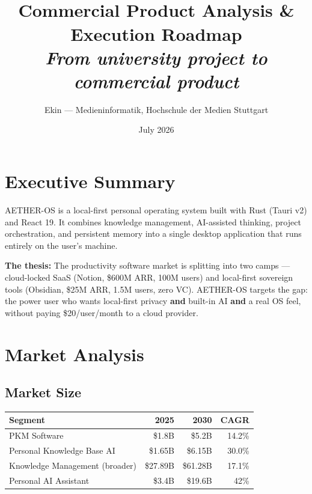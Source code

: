 \documentclass[11pt,a4paper]{article}
\title{\vspace{2cm}{\Huge\textbf{AETHER-OS}}\\[0.5cm]{\Large Commercial Product Analysis \& Execution Roadmap}\\[0.3cm]{\large\textit{From university project to commercial product}}\\[1cm]}
\author{Ekin --- Medieninformatik, Hochschule der Medien Stuttgart}
\date{July 2026}
\begin{document}
\maketitle
\thispagestyle{empty}
\newpage
\tableofcontents
\newpage

\section{Executive Summary}

AETHER-OS is a local-first personal operating system built with Rust (Tauri v2) and React 19. It combines knowledge management, AI-assisted thinking, project orchestration, and persistent memory into a single desktop application that runs entirely on the user's machine.

\textbf{The thesis:} The productivity software market is splitting into two camps --- cloud-locked SaaS (Notion, \$600M ARR, 100M users) and local-first sovereign tools (Obsidian, \$25M ARR, 1.5M users, zero VC). AETHER-OS targets the gap: the power user who wants local-first privacy \textbf{and} built-in AI \textbf{and} a real OS feel, without paying \$20/user/month to a cloud provider.

\section{Market Analysis}

\subsection{Market Size}

\begin{table}[h]\centering\small
\begin{tabularx}{\textwidth}{Xrrr}
\toprule
\textbf{Segment} & \textbf{2025} & \textbf{2030} & \textbf{CAGR} \\
\midrule
PKM Software & \$1.8B & \$5.2B & 14.2\% \\
Personal Knowledge Base AI & \$1.65B & \$6.15B & 30.0\% \\
Knowledge Management (broader) & \$27.89B & \$61.28B & 17.1\% \\
Personal AI Assistant & \$3.4B & \$19.6B & 42\% \\
\bottomrule
\end{tabularx}
\end{table}
\end{document}
